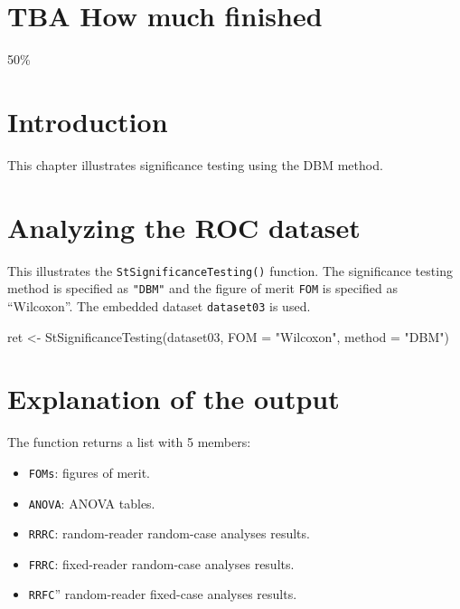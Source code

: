 \documentclass[
]{book}
\newenvironment{Shaded}{\begin{snugshade}}{\end{snugshade}}
\newcommand{\AttributeTok}[1]{\textcolor[rgb]{0.77,0.63,0.00}{#1}}
\newcommand{\FunctionTok}[1]{\textcolor[rgb]{0.00,0.00,0.00}{#1}}
\newcommand{\NormalTok}[1]{#1}
\newcommand{\OtherTok}[1]{\textcolor[rgb]{0.56,0.35,0.01}{#1}}
\newcommand{\StringTok}[1]{\textcolor[rgb]{0.31,0.60,0.02}{#1}}
\providecommand{\tightlist}{%
  \setlength{\itemsep}{0pt}\setlength{\parskip}{0pt}}
\begin{document}
\hypertarget{quick-start-dbm-text-how-much-finished}{%
\section{TBA How much finished}\label{quick-start-dbm-text-how-much-finished}}

50\%

\hypertarget{quick-start-dbm-text-intro}{%
\section{Introduction}\label{quick-start-dbm-text-intro}}

This chapter illustrates significance testing using the DBM method.

\hypertarget{quick-start-dbm-text-analyze-dataset}{%
\section{Analyzing the ROC dataset}\label{quick-start-dbm-text-analyze-dataset}}

This illustrates the \texttt{StSignificanceTesting()} function. The significance testing method is specified as \texttt{"DBM"} and the figure of merit \texttt{FOM} is specified as ``Wilcoxon''. The embedded dataset \texttt{dataset03} is used.

\begin{Shaded}
\begin{Highlighting}[]
\NormalTok{ret }\OtherTok{\textless{}{-}} \FunctionTok{StSignificanceTesting}\NormalTok{(dataset03, }\AttributeTok{FOM =} \StringTok{"Wilcoxon"}\NormalTok{, }\AttributeTok{method =} \StringTok{"DBM"}\NormalTok{)}
\end{Highlighting}
\end{Shaded}

\hypertarget{quick-start-dbm-text-explanation}{%
\section{Explanation of the output}\label{quick-start-dbm-text-explanation}}

The function returns a list with 5 members:

\begin{itemize}
\tightlist
\item
  \texttt{FOMs}: figures of merit.
\item
  \texttt{ANOVA}: ANOVA tables.
\item
  \texttt{RRRC}: random-reader random-case analyses results.
\item
  \texttt{FRRC}: fixed-reader random-case analyses results.
\item
  \texttt{RRFC}'' random-reader fixed-case analyses results.
\end{itemize}
\end{document}
